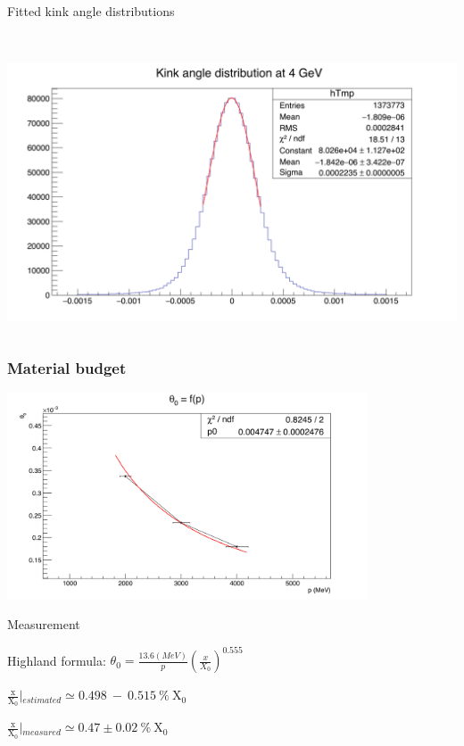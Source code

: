 \documentclass{beamer}
\begin{document}
\begin{frame}
\begin{block}{Fitted kink angle distributions}
\begin{columns}[c]
\begin{column}{5cm}
          \ 
          \includegraphics[width = \textwidth]{Pictures/kinkAngle4GeV.png}
        \end{column} 
      \end{columns}
    \end{block}
  \end{frame}

  \begin{frame}
    \frametitle{Material budget}

    \vspace{-0.3cm}
    \begin{center}
      \includegraphics[width = 0.8\textwidth]{Pictures/theta0VsP_2-4GeV.png}
    \end{center}

    \vspace{-0.4cm}
    \begin{block}{Measurement}
      \begin{center}
      Highland formula: $\theta_0 = \frac{13.6 (MeV)}{p}\left( \frac{x}{X_0}\right)^{0.555}$
       
       $\frac{\text{x}}{\text{X}_0}\left|_{estimated} \simeq 0.498~-~0.515~\%~\text{X}_0 \right.$

       $\frac{\text{x}}{\text{X}_0}\left|_{measured} \simeq 0.47 \pm 0.02~\%~\text{X}_0 \right.$
      \end{center}
    \end{block}

  \end{frame}
\end{document}
